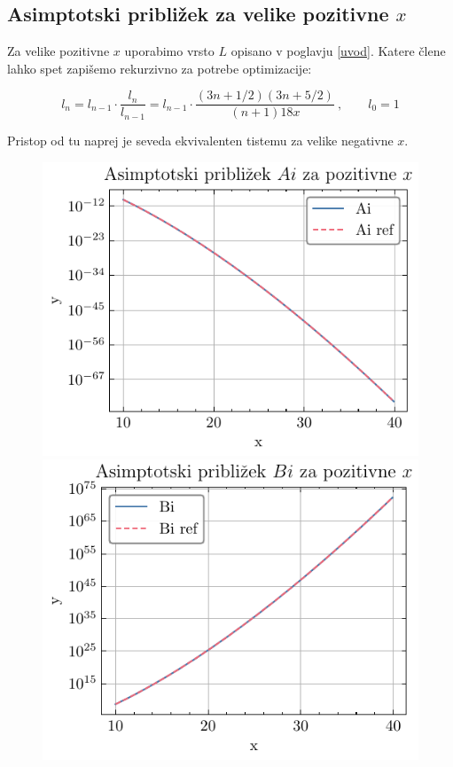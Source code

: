 \documentclass[slovene,11pt,a4paper]{article}
\begin{document}
\subsection{Asimptotski približek za velike pozitivne $x$}


Za velike pozitivne $x$ uporabimo vrsto $L$ opisano v poglavju \ref{uvod}. Katere člene lahko spet zapišemo rekurzivno za potrebe optimizacije:

\begin{equation*}
  l_n = l_{n-1} \cdot \frac{l_n}{l_{n-1}} = l_{n-1} \cdot \frac{(3n + 1/2)(3n + 5/2)}{(n + 1)18x} \>, \qquad l_0 = 1
\end{equation*}

Pristop od tu naprej je seveda ekvivalenten tistemu za velike negativne $x$.

\begin{figure}[h]
  \centering
  \begin{minipage}{0.48\textwidth}
    \centering
    \includegraphics[width=\linewidth]{graphs/pos_draw_ai.pdf}
  \end{minipage}\hfill
  \begin{minipage}{0.48\textwidth}
    \centering
    \includegraphics[width=\linewidth]{graphs/pos_draw_bi.pdf}

\end{minipage}
\end{figure}
\end{document}
